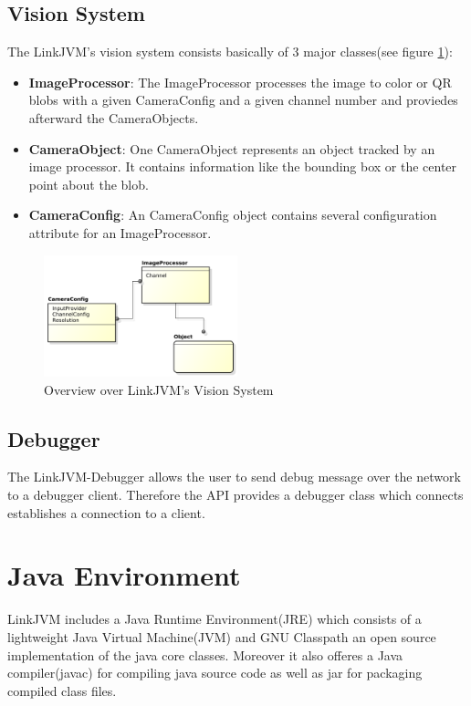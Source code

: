\documentclass{juniorjournal}
\begin{document}
\subsection{Vision System}
The LinkJVM's vision system consists basically of 3 major classes(see figure \ref{fig:Vision-System}):
\begin{itemize}
	\item {\bf ImageProcessor}: The ImageProcessor processes the image to color or QR blobs with a given CameraConfig and a given channel number and proviedes afterward the CameraObjects. 
	\item {\bf CameraObject}: One CameraObject represents an object tracked by an image processor. It contains information like the bounding box or the center point about the blob.
	\item {\bf CameraConfig}: An CameraConfig object contains several configuration attribute for an ImageProcessor.
\end{itemize}
\begin{figure}[H]
\centering
\includegraphics[width=0.5\textwidth]{images/vision.pdf}
\caption{Overview over LinkJVM's Vision System}
\label{fig:Vision-System}
\end{figure}


\subsection{Debugger}
The LinkJVM-Debugger allows the user to send debug message over the network to a debugger client.
Therefore the API provides a debugger class which connects establishes a connection to a client.


\section{Java Environment}
LinkJVM includes a Java Runtime Environment(JRE) which consists of a lightweight Java Virtual Machine(JVM) and GNU Classpath an open source implementation of the java core classes.
Moreover it also offeres a Java compiler(javac) for compiling java source code as well as jar for packaging compiled class files.
\end{document}
